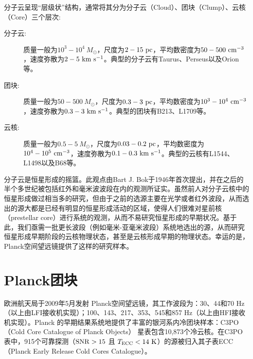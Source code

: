 \documentclass[UTF8]{pkuthss}
\begin{document}
		分子云呈现“层级状”结构\supercite{1994ApJ...423..681V}，通常将其分为分子云（Cloud）、团块（Clump）、云核（Core）三个层次\supercite{2007ARA&A..45..339B,2000prpl.conf...97W}:
		\begin{adjustwidth}{0.5cm}{0cm}
		\begin{description}
			\item[分子云:] 质量一般为$10^3-10^4\ M_{\odot}$，尺度为$2-15\rm\ pc$，平均数密度为$50-500\rm\ cm^{-3}$，速度弥散为$2- 5\rm\ km\ s^{-1}$\supercite{2007ARA&A..45..339B}。典型的分子云有Taurus、Perseus以及Orion等。

			\item[团块:] 质量一般为$50-500\ M_{\odot}$，尺度为$0.3-3\rm\ pc$，平均数密度为$10^3-10^4\rm\ cm^{-3}$，速度弥散为$0.3- 3\rm\ km\ s^{-1}$\supercite{2007ARA&A..45..339B}。典型的团块有B213、L1709等\supercite{2007ARA&A..45..339B}。

			\item[云核:] 质量一般为$0.5-5\ M_{\odot}$，尺度为$0.03-0.2\rm\ pc$，平均数密度为$10^4-10^5\rm\ cm^{-3}$，速度弥散为$0.1- 0.3\rm\ km\ s^{-1}$\supercite{2007ARA&A..45..339B}。典型的云核有L1544、L1498以及B68等\supercite{2007ARA&A..45..339B}。
		\end{description}
		\end{adjustwidth}

		分子云是恒星形成的摇篮。此观点由Bart J. Bok于1946年首次提出\supercite{1948HarMo...7...53B}，并在之后的半个多世纪被包括红外和毫米波波段在内的观测所证实\supercite{shu1987star,2007ARA&A..45..339B}。虽然前人对分子云核中的恒星形成做过相当多的研究，但由于之前的选源主要在光学或者红外波段，从而选出的源大都是已经有明显的恒星形成活动的区域，使得人们很难对星前核（prestellar core）进行系统的观测，从而不易研究恒星形成的早期状况。基于此，我们亟需一批更长波段（例如毫米-亚毫米波段）系统地选出的源，从而研究恒星形成早期阶段的云核物理状态，甚至是云核形成早期的物理状态。幸运的是，Planck空间望远镜提供了这样的研究样本。

	\section{Planck团块}

		欧洲航天局于2009年5月发射 Planck空间望远镜，其工作波段为：30、44和70 Hz（以上由LFI接收机实现）；100、143、217、353、545和857 Hz（以上由HFI接收机实现）\supercite{2011A&A...536A...1P}。Planck 的早期结果系统地提供了丰富的银河系内冷团块样本：C3PO（Cold Core Catalogue of Planck Objects） 星表包含10,873个冷云核\supercite{2011yCat.8088....0P,2011A&A...536A..23P}。在C3PO表中，915个可靠探测（$\rm SNR>15$ 且 $T_{\rm ECC}<14\rm\ K$）的源被归入其子表ECC（Planck Early Release Cold Cores Catalogue）\supercite{2011yCat.8088....0P,2011A&A...536A..23P}。
\end{document}
